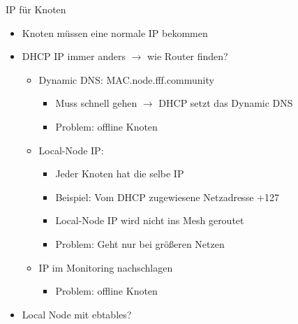 \begin{frame}{IP für Knoten}
    \begin{itemize}
        \item Knoten müssen eine normale IP bekommen
        \item DHCP IP immer anders $\rightarrow$ wie Router finden?
        \begin{itemize}
            \item Dynamic DNS: MAC.node.fff.community
            \begin{itemize}
                \item Muss schnell gehen $\rightarrow$ DHCP setzt das Dynamic DNS
                \item Problem: offline Knoten
            \end{itemize}
            \item Local-Node IP:
            \begin{itemize}
                \item Jeder Knoten hat die selbe IP
                \item Beispiel: Vom DHCP zugewiesene Netzadresse +127
                \item Local-Node IP wird nicht ins Mesh geroutet
                \item Problem: Geht nur bei größeren Netzen
            \end{itemize}
            \item IP im Monitoring nachschlagen
            \begin{itemize}
                \item Problem: offline Knoten
            \end{itemize}
        \end{itemize}
        \item Local Node mit ebtables?
    \end{itemize}
\end{frame}

